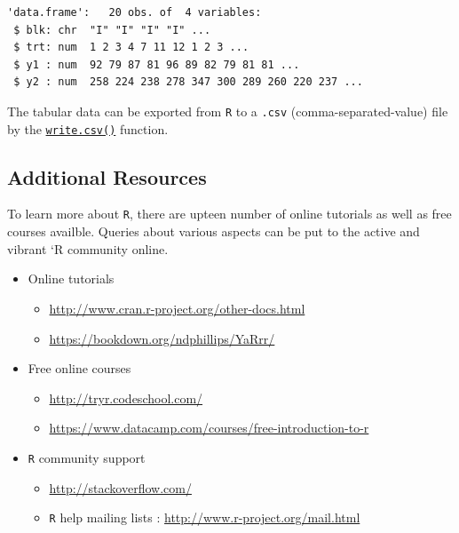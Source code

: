 \begin{verbatim}
'data.frame':   20 obs. of  4 variables:
 $ blk: chr  "I" "I" "I" "I" ...
 $ trt: num  1 2 3 4 7 11 12 1 2 3 ...
 $ y1 : num  92 79 87 81 96 89 82 79 81 81 ...
 $ y2 : num  258 224 238 278 347 300 289 260 220 237 ...
\end{verbatim}

The tabular data can be exported from \texttt{R} to a \texttt{.csv}
(comma-separated-value) file by the
\href{https://www.rdocumentation.org/packages/utils/versions/3.5.1/topics/write.table}{\texttt{write.csv()}}
function.

\begin{Shaded}
\begin{Highlighting}[]
\NormalTok{(} \NormalTok{)}
\end{Highlighting}
\end{Shaded}

\hypertarget{additional-resources}{%
\subsection{Additional Resources}\label{additional-resources}}

To learn more about \texttt{R}, there are upteen number of online
tutorials as well as free courses availble. Queries about various
aspects can be put to the active and vibrant `R community online.

\begin{itemize}
\tightlist
\item
  Online tutorials

  \begin{itemize}
  \tightlist
  \item
    \url{http://www.cran.r-project.org/other-docs.html}
  \item
    \url{https://bookdown.org/ndphillips/YaRrr/}
  \end{itemize}
\item
  Free online courses

  \begin{itemize}
  \tightlist
  \item
    \url{http://tryr.codeschool.com/}
  \item
    \url{https://www.datacamp.com/courses/free-introduction-to-r}
  \end{itemize}
\item
  \texttt{R} community support

  \begin{itemize}
  \tightlist
  \item
    \url{http://stackoverflow.com/}
  \item
    \texttt{R} help mailing lists :
    \url{http://www.r-project.org/mail.html}
  \end{itemize}
\end{itemize}

